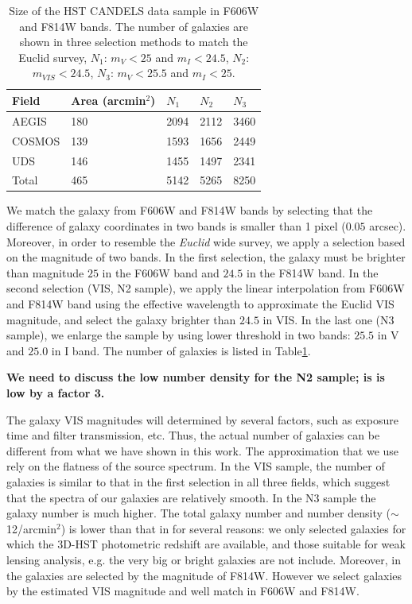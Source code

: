 \documentclass[useAMS,usenatbib]{mnras}
\begin{document}
\begin{center}
\begin{table}
  \begin{tabular}{lllll}
    \hline
    Field   &Area (arcmin$^2$) &$N_1$ &$N_2$ &$N_3$\\
    \hline
    AEGIS   &180   &2094  &2112  &3460\\
    COSMOS  &139   &1593  &1656  &2449\\
    UDS     &146   &1455  &1497  &2341\\
    Total   &465   &5142  &5265  &8250\\
    \hline
  \end{tabular}
  \caption{\label{table:mag} Size of the HST CANDELS data sample in F606W
    and F814W bands.  The number of galaxies are shown in three selection
    methods to match the Euclid survey, $N_1$: $m_V<25$ and $m_I<24.5$,
    $N_2$: $m_{VIS}<24.5$, $N_3$: $m_V<25.5$ and $m_I<25$. }
\end{table}
\end{center}
%

We match the galaxy from F606W and F814W bands by selecting that
the difference of galaxy coordinates in two bands is smaller than 1
pixel ($0.05$ arcsec). Moreover, in order to resemble the {\it Euclid} 
wide survey, we apply a selection based on the magnitude of two bands. In the
first selection, the galaxy must be brighter than magnitude $25$ in
the F606W band and $24.5$ in the F814W band. In the second selection (VIS, N2 sample),
we apply the linear interpolation from F606W and F814W band using the
effective wavelength to approximate the Euclid VIS magnitude, and
select the galaxy brighter than $24.5$ in VIS. In the last one (N3
sample), we enlarge the sample by using lower threshold in two bands:
$25.5$ in V and $25.0$ in I band. The number of galaxies is listed in
Table\ref{table:mag}.


{\bf We need to discuss the low number density for the N2 sample; is is low
by a factor 3.}


The galaxy VIS magnitudes will determined by several factors, such as
exposure time and filter transmission, etc. Thus, the actual number of
galaxies can be different from what we have shown in this work. The
approximation that we use rely on the flatness of the source
spectrum. In the VIS sample, the number of galaxies is similar to that in
the first selection in all three fields, which suggest that the
spectra of our galaxies are relatively smooth. In the N3 sample the galaxy
number is much higher.
%
The total galaxy number and number density ($\sim$12/arcmin$^2$) is
lower than that in  for several reasons: we only selected
galaxies for  which the 3D-HST photometric redshift are available, and those
suitable for weak lensing analysis, e.g. the very big or bright
galaxies are not include. Moreover, in  the galaxies are selected
by the magnitude of F814W. However we select galaxies by the estimated
VIS magnitude and well match in F606W and F814W.
\end{document}

